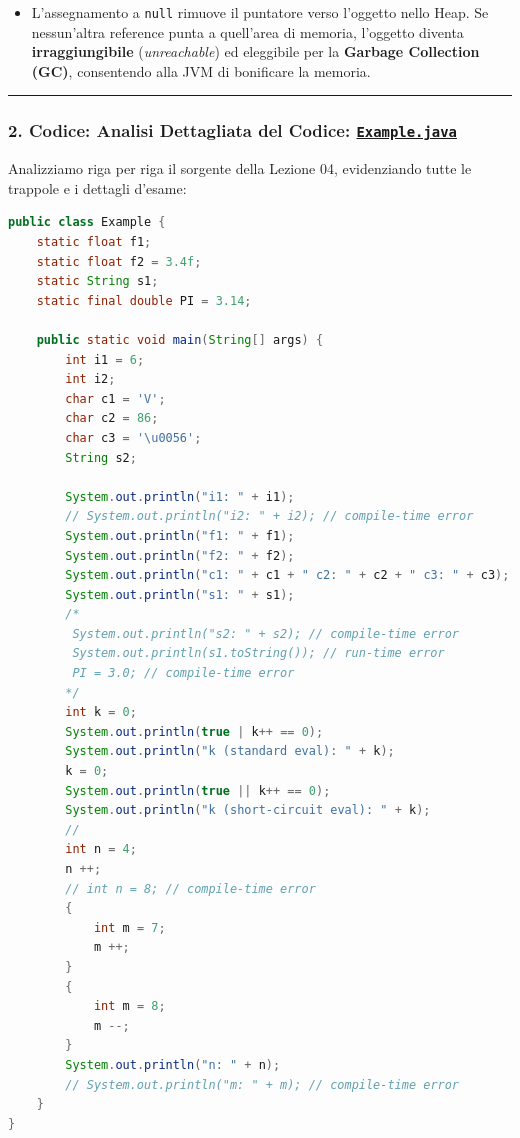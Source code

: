 \documentclass[11pt,a4paper]{article}
\newcommand{\passthrough}[1]{#1}
\providecommand{\tightlist}{\setlength{\itemsep}{0pt}\setlength{\parskip}{0pt}}
\begin{document}
\begin{itemize}
  \begin{itemize}
  \tightlist
  \item
    L'assegnamento a \passthrough{\lstinline!null!} rimuove il puntatore
    verso l'oggetto nello Heap. Se nessun'altra reference punta a
    quell'area di memoria, l'oggetto diventa \textbf{irraggiungibile}
    (\emph{unreachable}) ed eleggibile per la \textbf{Garbage Collection
    (GC)}, consentendo alla JVM di bonificare la memoria.
  \end{itemize}
\end{itemize}

\begin{center}\rule{0.5\linewidth}{0.5pt}\end{center}

\subsubsection{\texorpdfstring{2. Codice: Analisi Dettagliata del
Codice:
\href{file:///home/wally/Documenti/GitHub/Programmazione-II/25-26/Teoria-e-Esercitazioni/Codice-20260902/Lezione04/Example.java}{\texttt{Example.java}}}{2. Codice: Analisi Dettagliata del Codice: Example.java}}\label{codice-analisi-dettagliata-del-codice-example.java}

Analizziamo riga per riga il sorgente della Lezione 04, evidenziando
tutte le trappole e i dettagli d'esame:

\begin{lstlisting}[language=Java]
public class Example {
    static float f1;
    static float f2 = 3.4f;
    static String s1;
    static final double PI = 3.14; 
    
    public static void main(String[] args) {
        int i1 = 6;
        int i2;
        char c1 = 'V';
        char c2 = 86;
        char c3 = '\u0056';
        String s2;
            
        System.out.println("i1: " + i1);
        // System.out.println("i2: " + i2); // compile-time error
        System.out.println("f1: " + f1);
        System.out.println("f2: " + f2);
        System.out.println("c1: " + c1 + " c2: " + c2 + " c3: " + c3);
        System.out.println("s1: " + s1);
        /*
         System.out.println("s2: " + s2); // compile-time error
         System.out.println(s1.toString()); // run-time error
         PI = 3.0; // compile-time error
        */
        int k = 0;
        System.out.println(true | k++ == 0);
        System.out.println("k (standard eval): " + k);
        k = 0;
        System.out.println(true || k++ == 0);
        System.out.println("k (short-circuit eval): " + k);
        //
        int n = 4;
        n ++;
        // int n = 8; // compile-time error
        {
            int m = 7;
            m ++;
        }
        {
            int m = 8;
            m --;
        }
        System.out.println("n: " + n);
        // System.out.println("m: " + m); // compile-time error
    }
}
\end{lstlisting}
\end{document}
